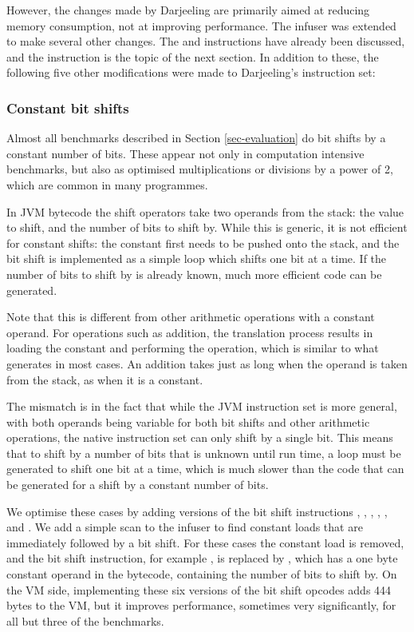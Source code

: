 However, the changes made by Darjeeling are primarily aimed at reducing memory consumption, not at improving performance. The infuser was extended to make several other changes. The  and  instructions have already been discussed, and the  instruction is the topic of the next section. In addition to these, the following five other modifications were made to Darjeeling's instruction set:

\subsubsection{Constant bit shifts}
\label{sec-opt-constant-shift}


Almost all benchmarks described in Section \ref{sec-evaluation} do bit shifts by a constant number of bits. These appear not only in computation intensive benchmarks, but also as optimised multiplications or divisions by a power of 2, which are common in many programmes.

In JVM bytecode the shift operators take two operands from the stack: the value to shift, and the number of bits to shift by. While this is generic, it is not efficient for constant shifts: the constant first needs to be pushed onto the stack, and the bit shift is implemented as a simple loop which shifts one bit at a time. If the number of bits to shift by is already known, much more efficient code can be generated.

Note that this is different from other arithmetic operations with a constant operand. For operations such as addition, the translation process results in loading the constant and performing the operation, which is similar to what  generates in most cases. An addition takes just as long when the operand is taken from the stack, as when it is a constant. 

The mismatch is in the fact that while the JVM instruction set is more general, with both operands being variable for both bit shifts and other arithmetic operations, the native instruction set can only shift by a single bit. This means that to shift by a number of bits that is unknown until run time, a loop must be generated to shift one bit at a time, which is much slower than the code that can be generated for a shift by a constant number of bits.

We optimise these cases by adding  versions of the bit shift instructions , , , , , and . We add a simple scan to the infuser to find constant loads that are immediately followed by a bit shift. For these cases the constant load is removed, and the bit shift instruction, for example , is replaced by , which has a one byte constant operand in the bytecode, containing the number of bits to shift by. On the VM side, implementing these six  versions of the bit shift opcodes adds 444 bytes to the VM, but it improves performance, sometimes very significantly, for all but three of the benchmarks.

